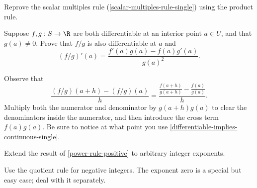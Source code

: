 \begin{exercise}
	 Reprove the scalar multiples rule (\cref{scalar-multiples-rule-single}) using the product rule. 
\end{exercise}

\begin{exercise} \label{quotient-rule}
	Suppose $f, g : S \to \R$ are both differentiable at an interior point $a \in U$, and that $g(a) \neq 0$. Prove that $f/g$ is also differentiable at $a$ and 
	\[ (f/g)'(a) = \frac{f'(a)g(a) - f(a)g'(a)}{g(a)^2}. \] 
	\begin{hint} Observe that \[ \frac{(f/g)(a+h)-(f/g)(a)}{h} = \frac{\frac{f(a+h)}{g(a+h)} - \frac{f(a)}{g(a)} }{h}. \]
	Multiply both the numerator and denominator by $g(a+h)g(a)$ to clear the denominators inside the numerator, and then introduce the cross term $f(a)g(a)$. Be sure to notice at what point you use \cref{differentiable-implies-continuous-single}.
	\end{hint}
\end{exercise}

\begin{exercise} \label{power-rule-integer}
	Extend the result of \cref{power-rule-positive} to arbitrary integer exponents. 
	\begin{hint} Use the quotient rule for negative integers. The exponent zero is a special but easy case; deal with it separately. 
	\end{hint}
\end{exercise}

